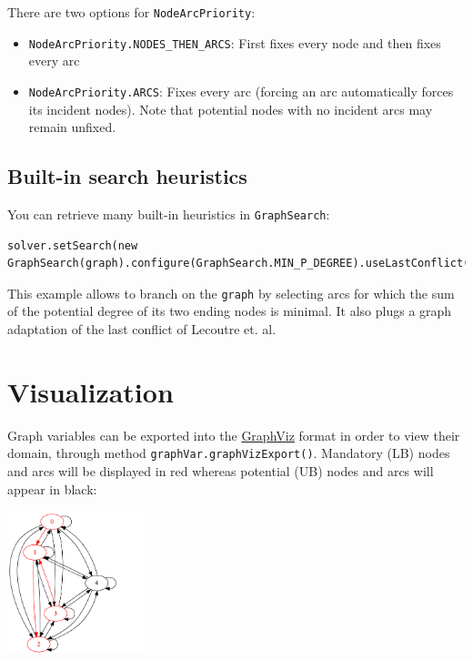\documentclass{article}
\begin{document}
There are two options for \texttt{NodeArcPriority}:
\begin{itemize}
\item \texttt{NodeArcPriority.NODES\_THEN\_ARCS}: First fixes every node and then fixes every arc
\item \texttt{NodeArcPriority.ARCS}: Fixes every arc (forcing an arc automatically forces its incident nodes). Note that potential nodes with no incident arcs may remain unfixed. 
\end{itemize}

\subsection{Built-in search heuristics}

You can retrieve many built-in heuristics in \texttt{GraphSearch}:

\begin{lstlisting}
solver.setSearch(new GraphSearch(graph).configure(GraphSearch.MIN_P_DEGREE).useLastConflict());
\end{lstlisting}

This example allows to branch on the \texttt{graph} by selecting arcs for which the sum of the potential degree of its two ending nodes is minimal. 
It also plugs a graph adaptation of the last conflict of Lecoutre et. al. 

\section{Visualization}

Graph variables can be exported into the \href{http://www.webgraphviz.com/}{GraphViz} format in order to view their domain, through method \texttt{graphVar.graphVizExport()}. 
Mandatory (LB) nodes and arcs will be displayed in red whereas potential (UB) nodes and arcs will appear in black: 

\includegraphics[width=4cm]{graphViz}
\end{document}

